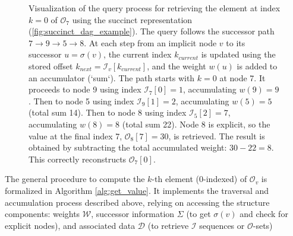 \begin{figure}[htbp]
    \caption{Visualization of the query process for retrieving the element at index $k=0$ of $\mathcal{O}_7$ using the succinct representation (\autoref{fig:succinct_dag_example}). The query follows the successor path $7 \to 9 \to 5 \to 8$. At each step from an implicit node $v$ to its successor $u=\sigma(v)$, the current index $k_{current}$ is updated using the stored offset $k_{next} = \mathcal{I}_v[k_{current}]$, and the weight $w(u)$ is added to an accumulator (`sum`). The path starts with $k=0$ at node 7. It proceeds to node 9 using index $\mathcal{I}_7[0]=1$, accumulating $w(9)=9$. Then to node 5 using index $\mathcal{I}_9[1]=2$, accumulating $w(5)=5$ (total sum 14). Then to node 8 using index $\mathcal{I}_5[2]=7$, accumulating $w(8)=8$ (total sum 22). Node 8 is explicit, so the value at the final index 7, $\mathcal{O}_8[7]=30$, is retrieved. The result is obtained by subtracting the total accumulated weight: $30 - 22 = 8$. This correctly reconstructs $\mathcal{O}_7[0]$.}
    \label{fig:query_path_node7}
\end{figure}

The general procedure to compute the $k$-th element ($0$-indexed) of $\mathcal{O}_v$ is formalized in Algorithm \ref{alg:get_value}. It implements the traversal and accumulation process described above, relying on accessing the structure components: weights $\mathcal{W}$, successor information $\Sigma$ (to get $\sigma(v)$ and check for explicit nodes), and associated data $\mathcal{D}$ (to retrieve $\mathcal{I}$ sequences or $\mathcal{O}$-sets)

